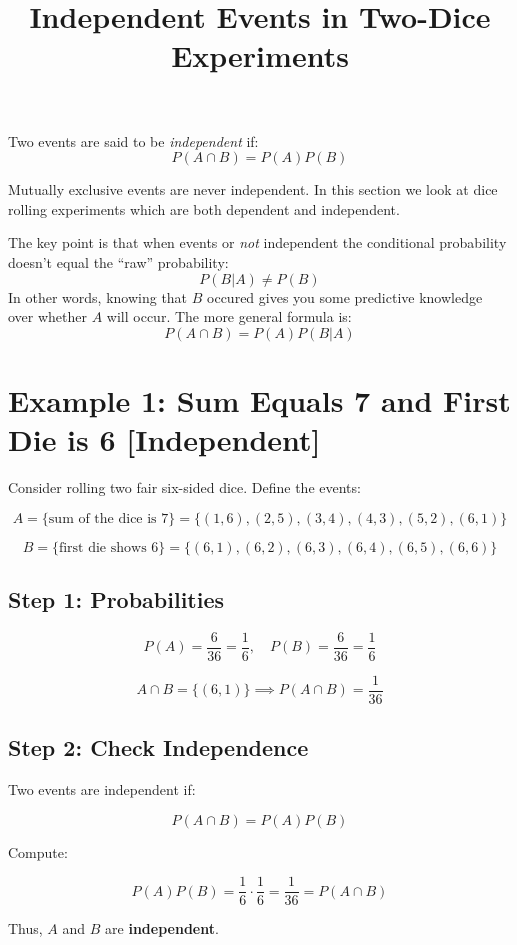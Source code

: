 \documentclass[12pt]{article}
\title{Independent Events in Two-Dice Experiments}
\author{}
\date{}
\begin{document}
\maketitle

\Large

Two events are said to be \emph{independent} if:
\[ P(A \cap B) = P(A)P(B)\]

Mutually exclusive events are never independent. In this section we look at dice rolling experiments which are both dependent and independent. 

The key point is that when events or \emph{not} independent the conditional probability doesn't equal the ``raw'' probability:
\[ P(B | A) \neq P(B) \]
In other words, knowing that $B$ occured gives you some predictive knowledge over whether $A$ will occur.
The more general formula is:
\[ P(A \cap B) = P(A)P(B|A)\]




\section*{Example 1: Sum Equals 7 and First Die is 6 [Independent]}

Consider rolling two fair six-sided dice. Define the events:

\[
A = \{\text{sum of the dice is 7}\} = \{(1,6),(2,5),(3,4),(4,3),(5,2),(6,1)\}
\]

\[
B = \{\text{first die shows 6}\} = \{(6,1),(6,2),(6,3),(6,4),(6,5),(6,6)\}
\]

\subsection*{Step 1: Probabilities}

\[
P(A) = \frac{6}{36} = \frac{1}{6}, \quad
P(B) = \frac{6}{36} = \frac{1}{6}
\]

\[
A \cap B = \{(6,1)\} \implies P(A \cap B) = \frac{1}{36}
\]

\subsection*{Step 2: Check Independence}

Two events are independent if:

\[
P(A \cap B) = P(A)P(B)
\]

Compute:

\[
P(A)P(B) = \frac{1}{6} \cdot \frac{1}{6} = \frac{1}{36} = P(A \cap B)
\]

Thus, \(A\) and \(B\) are \textbf{independent}.
\end{document}
